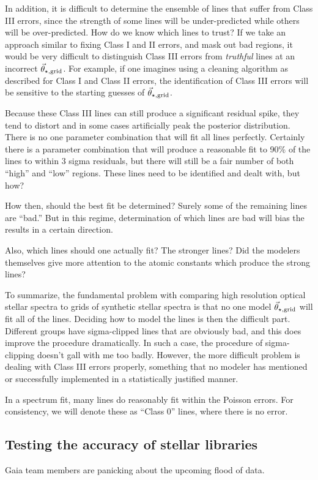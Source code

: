 \documentclass[preprint]{aastex} %
\newcommand{\vt}{\vec{\theta}}
\newcommand{\vg}{\vt_{\star, {\rm grid}}}
\begin{document}
In addition, it is difficult to determine the ensemble of lines that suffer from Class III errors, since the strength of some lines will be under-predicted while others will be over-predicted. How do we know which lines to trust? If we take an approach similar to fixing Class I and II errors, and mask out bad regions, it would be very difficult to distinguish Class III errors from \emph{truthful} lines at an incorrect $\vg$. For example, if one imagines using a cleaning algorithm as described for Class I and Class II errors, the identification of Class III errors will be sensitive to the starting guesses of $\vg$.

Because these Class III lines can still produce a significant residual spike, they tend to distort and in some cases artificially peak the posterior distribution. There is no one parameter combination that will fit all lines perfectly. Certainly there is a parameter combination that will produce a reasonable fit to 90\% of the lines to within 3 sigma residuals, but there will still be a fair number of both ``high'' and ``low'' regions. These lines need to be identified and dealt with, but how?

How then, should the best fit be determined? Surely some of the remaining lines are ``bad.'' But in this regime, determination of which lines are bad will bias the results in a certain direction.

Also, which lines should one actually fit? The stronger lines? Did the modelers themselves give more attention to the atomic constants which produce the strong lines?

To summarize, the fundamental problem with comparing high resolution optical stellar spectra to grids of synthetic stellar spectra is that no one model $\vg$ will fit all of the lines. Deciding how to model the lines is then the difficult part. Different groups have sigma-clipped lines that are obviously bad, and this does improve the procedure dramatically. In such a case, the procedure of sigma-clipping doesn't gall with me too badly. However, the more difficult problem is dealing with Class III errors properly, something that no modeler has mentioned or successfully implemented in a statistically justified manner.

In a spectrum fit, many lines do reasonably fit within the Poisson errors. For consistency, we will denote these as ``Class 0'' lines, where there is no error.

\subsection{Testing the accuracy of stellar libraries}
Gaia team members are panicking about the upcoming flood of data.
\end{document}
